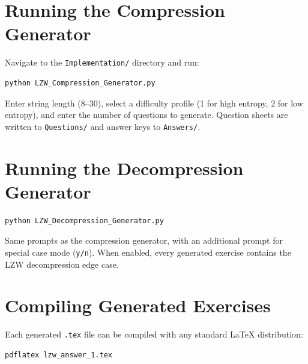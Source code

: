 \documentclass{l4proj}
\begin{document}
\begin{appendices}
\section*{Running the Compression Generator}
Navigate to the \texttt{Implementation/} directory and run:
\begin{verbatim}
python LZW_Compression_Generator.py
\end{verbatim}
Enter string length (8--30), select a difficulty profile (1 for high entropy, 2 for low entropy), and enter the number of questions to generate. Question sheets are written to \texttt{Questions/} and answer keys to \texttt{Answers/}.

\section*{Running the Decompression Generator}
\begin{verbatim}
python LZW_Decompression_Generator.py
\end{verbatim}
Same prompts as the compression generator, with an additional prompt for special case mode (\texttt{y/n}). When enabled, every generated exercise contains the LZW decompression edge case.

\section*{Compiling Generated Exercises}
Each generated \texttt{.tex} file can be compiled with any standard LaTeX distribution:
\begin{verbatim}
pdflatex lzw_answer_1.tex
\end{verbatim}


\end{appendices}





\renewcommand{\thechapter}{0} 

\end{document}
